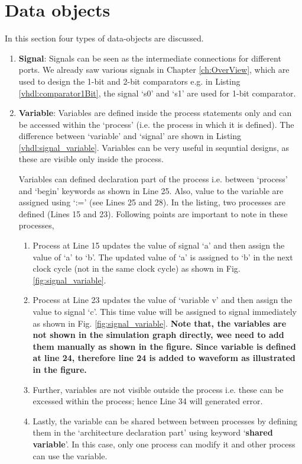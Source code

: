 \section{Data objects}\label{dataOjbects}
In this section four types of data-objects are discussed. 
\begin{enumerate}
	\item \textbf{Signal}: Signals can be seen as the intermediate connections for different ports. We already saw various signals in Chapter \ref{ch:OverView}, which are used to design the 1-bit and 2-bit comparators e.g. in Listing \ref{vhdl:comparator1Bit}, the signal `s0' and `s1' are used for 1-bit comparator. 
	
	\item \textbf{Variable}: Variables are defined inside the process statements only and can be accessed within the `process' (i.e. the process in which it is defined). The difference between `variable' and `signal' are shown in Listing \ref{vhdl:signal_variable}. Variables can be very useful in sequntial designs, as these are visible only inside the process. 
	
	\begin{explanation}
		Variables can defined declaration part of the process i.e. between `process' and `begin' keywords as shown in Line 25. Also, value to the variable are assigned using `:=' (see Lines 25 and 28). In the listing, two processes are defined (Lines 15 and 23). Following points are important to note in these processes, 
		\begin{enumerate}
			\item Process at Line 15 updates the value of signal `a' and then assign the value of `a' to `b'. The updated value of `a' is assigned to `b' in the next clock cycle (not in the same clock cycle) as shown in Fig. \ref{fig:signal_variable}. 
			\item Process at Line 23 updates the value of `variable v' and then assign the value to signal `c'. This time value will be assigned to signal immediately as shown in Fig. \ref{fig:signal_variable}. \textbf{Note that, the variables are not shown in the simulation graph directly, wee need to add them manually as shown in the figure. Since variable is defined at line 24, therefore line 24 is added to waveform as illustrated in the figure. }
			\item Further, variables are not visible outside the process i.e. these can be excessed within the process; hence Line 34 will generated error. 
				\item Lastly, the variable can be shared between between processes by defining them in the `architecture declaration part' using keyword `\textbf{shared variable}'. In this case, only one process can modify it and other process can use the variable. 
		\end{enumerate}		
	\end{explanation}
	

\end{enumerate}
